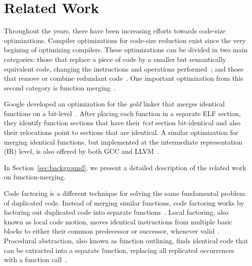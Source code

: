 \section{Related Work}

Throughout the years, there have been increasing efforts towards code-size
optimizations.
Compiler optimizations for code-size reduction exist since the very begining
of optimizing compilers.
These optimizations can be divided in two main categories:
those that replace a piece of code by a smaller but semantically equivalent code,
changing the instructions and operations performed~\cite{massalin87,tanenbaum82};
and those that remove or combine redundant code~\cite{cocke70,knoop94,ernst97,
                                              cooper99,debray00,chen03,loki04}.
One important optimization from this second category is function
merging~\cite{tallam10,edler14}.

Google developed an optimization for the \textit{gold} linker that merges
identical functions on a bit-level~\cite{tallam10,kwan12}.
After placing each function in a separate ELF section, they identify function
sections that have their \textit{text} section bit-identical and also their
relocations point to sections that are identical.
A similar optimization for merging identical functions, but implemented at the
intermediate representation (IR) level, is also offered by both GCC and
LLVM~\cite{llvm-fm,livska14}.

In Section~\ref{sec:background}, we present a detailed description of the
related work on function-merging.



Code factoring is a different technique for solving the same fundamental problem
of duplicated code.
Instead of merging similar functions, code factoring works by factoring out
duplicated code into separate functions~\cite{loki04}.
Local factoring, also known as local code motion, moves identical instructions
from multiple basic blocks to either their common predecessor or successor,
whenever valid~\cite{knoop94,briggs94,loki04}.
Procedural abstraction, also known as function outlining, finds identical code
that can be extracted into a separate function, replacing all replicated
occurrences with a function call~\cite{loki04,dreweke07}.

